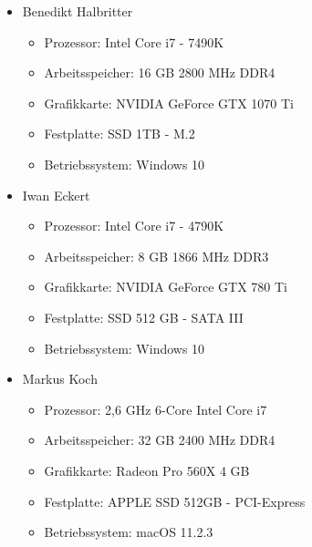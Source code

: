 \begin{itemize}
    \item Benedikt Halbritter
    \begin{itemize}
        \item Prozessor: Intel Core i7 - 7490K
        \item Arbeitsspeicher: 16 GB 2800 MHz DDR4
        \item Grafikkarte: NVIDIA GeForce GTX 1070 Ti
        \item Festplatte: SSD 1TB - M.2
        \item Betriebssystem: Windows 10
    \end{itemize}
    \item Iwan Eckert
    \begin{itemize}
        \item Prozessor: Intel Core i7 - 4790K
        \item Arbeitsspeicher: 8 GB 1866 MHz DDR3
        \item Grafikkarte: NVIDIA GeForce GTX 780 Ti
        \item Festplatte: SSD 512 GB - SATA III
        \item Betriebssystem: Windows 10
    \end{itemize}
    \item Markus Koch
    \begin{itemize}
        \item Prozessor: 2,6 GHz 6-Core Intel Core i7
        \item Arbeitsspeicher: 32 GB 2400 MHz DDR4
        \item Grafikkarte: Radeon Pro 560X 4 GB
        \item Festplatte: APPLE SSD 512GB - PCI-Express
        \item Betriebssystem: macOS 11.2.3
    \end{itemize}
\end{itemize}

\newpage

